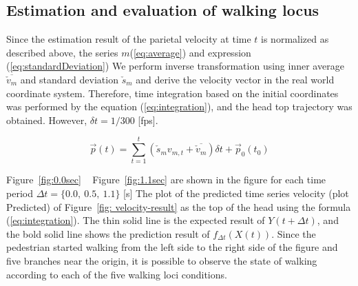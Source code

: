 \documentclass{sigchi}
\begin{document}
\subsection{Estimation and evaluation of walking locus}

Since the estimation result of the parietal velocity at time $ t $ is normalized as described above, the series $ m $(\ref {eq:average}) and expression (\ref {eq:standardDeviation}) We perform inverse transformation using inner average $ \overline {\check {v} _ {m}} $ and standard deviation $ \check {s} _ m $ and derive the velocity vector in the real world coordinate system. Therefore, time integration based on the initial coordinates was performed by the equation (\ref {eq:integration}), and the head top trajectory was obtained. However, $ \delta t = 1/300 $ [fps].

\begin{equation}
\vec{p}(t) = \sum^{t}_{t=1}(\check{s}_m  v_{m,t} +  \overline{\check{v}_{m}})  \delta t+ \vec{p}_0(t_0)
\label{eq:integration}
\end{equation}


Figure~\ref{fig:0.0sec} ~ Figure~\ref{fig:1.1sec} are shown in the figure for each time period $ \Delta t = \{0.0, \ 0.5, \ 1.1 \} $ [s] The plot of the predicted time series velocity (plot Predicted) of Figure~\ref{fig: velocity-result} as the top of the head using the formula (\ref {eq:integration}). The thin solid line is the expected result of $ Y (t + \Delta t) $, and the bold solid line shows the prediction result of $ f_ {\Delta t} (X (t)) $. Since the pedestrian started walking from the left side to the right side of the figure and five branches near the origin, it is possible to observe the state of walking according to each of the five walking loci conditions.
\end{document}
